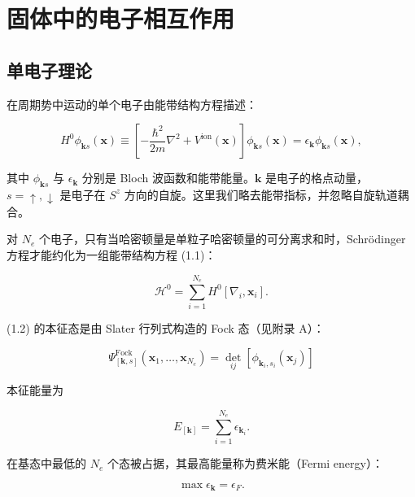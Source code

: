 \chapter{固体中的电子相互作用}

\section{单电子理论}

在周期势中运动的单个电子由能带结构方程描述：

\begin{equation*}
H ^ {0} \phi_ {\mathbf{k} s} (\mathbf{x}) \equiv \left[ - \frac {\hbar^ {2}}{2 m} \nabla^ {2} + V ^ {\mathrm{ion}} (\mathbf{x}) \right] \phi_ {\mathbf{k} s} (\mathbf{x}) = \epsilon_ {\mathbf{k}} \phi_ {\mathbf{k} s} (\mathbf{x}),
\tag{1.1}
\end{equation*}

其中 $\phi_{\mathbf{k}s}$ 与 $\epsilon_{\mathbf{k}}$ 分别是 Bloch 波函数和能带能量。$\mathbf{k}$ 是电子的格点动量，$s=\uparrow,\downarrow$ 是电子在 $S^{z}$ 方向的自旋。这里我们略去能带指标，并忽略自旋轨道耦合。

对 $N_{e}$ 个电子，只有当哈密顿量是单粒子哈密顿量的可分离求和时，Schrödinger 方程才能约化为一组能带结构方程 (1.1)：

\begin{equation*}
\mathcal {H} ^ {0} = \sum_ {i = 1} ^ {N _ {e}} H ^ {0} [ \nabla_ {i}, \mathbf {x} _ {i} ].
\tag{1.2}
\end{equation*}

(1.2) 的本征态是由 Slater 行列式构造的 Fock 态（见附录 A）：

\begin{equation*}
\Psi_ {[ \mathbf {k}, s ]} ^ {\mathrm{Fock}} (\mathbf {x} _ {1}, \dots , \mathbf {x} _ {N _ {e}}) = \det _ {ij} \left[ \phi_ {\mathbf {k} _ {i}, s _ {i}} (\mathbf {x} _ {j}) \right]
\tag{1.3}
\end{equation*}

本征能量为

\begin{equation*}
E _ {[ \mathbf {k} ]} = \sum_ {i = 1} ^ {N _ {e}} \epsilon_ {\mathbf {k} _ {i}}.
\tag{1.4}
\end{equation*}

在基态中最低的 $N_{e}$ 个态被占据，其最高能量称为费米能（Fermi energy）：

\begin{equation*}
\max \epsilon_ {\mathbf {k}} = \epsilon_ {F}.
\tag{1.5}
\end{equation*}

